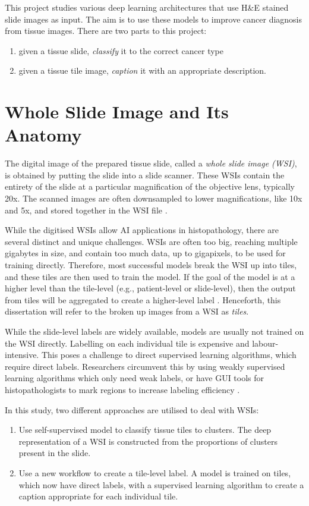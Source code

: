 \documentclass{l4proj}
\begin{document}
This project studies various deep learning architectures that use H\&E stained slide images as input. The aim is to use these models to improve cancer diagnosis from tissue images. There are two parts to this project:
\begin{enumerate}
    \item given a tissue slide, \emph{classify} it to the correct cancer type
    \item given a tissue tile image, \emph{caption} it with an appropriate description.
\end{enumerate}

\section{Whole Slide Image and Its Anatomy} \label{sec:WSI_anatomy}
The digital image of the prepared tissue slide, called a \emph{whole slide image (WSI)}, is obtained by putting the slide into a slide scanner. These WSIs contain the entirety of the slide at a particular magnification of the objective lens, typically 20x. The scanned images are often downsampled to lower magnifications, like 10x and 5x, and stored together in the WSI file \citep{Zarella2018}. 

While the digitised WSIs allow AI applications in histopathology, there are several distinct and unique challenges. WSIs are often too big, reaching multiple gigabytes in size, and contain too much data, up to gigapixels, to be used for training directly. Therefore, most successful models break the WSI up into tiles, and these tiles are then used to train the model. If the goal of the model is at a higher level than the tile-level (e.g., patient-level or slide-level), then the output from tiles will be aggregated to create a higher-level label \citep{Dimitriou2019}. Henceforth, this dissertation will refer to the broken up images from a WSI as \emph{tiles}. 

While the slide-level labels are widely available, models are usually not trained on the WSI directly. Labelling on each individual tile is expensive and labour-intensive. This poses a challenge to direct supervised learning algorithms, which require direct labels. Researchers circumvent this by using weakly supervised learning algorithms which only need weak labels, or have GUI tools for histopathologists to mark regions to increase labeling efficiency \citep{komura2018}.

In this study, two different approaches are utilised to deal with WSIs:
\begin{enumerate}
    \item Use self-supervised model to classify tissue tiles to clusters. The deep representation of a WSI is constructed from the proportions of clusters present in the slide.
    \item Use a new workflow to create a tile-level label. A model is trained on tiles, which now have direct labels, with a supervised learning algorithm to create a caption appropriate for each individual tile.
\end{enumerate}
\end{document}
